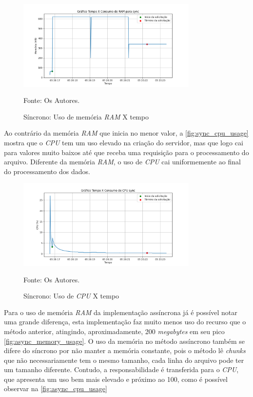 \documentclass[12pt]{article}
\begin{document}
\begin{figure}[!h]
\centering
\caption{Síncrono: Uso de memória \textit{RAM} X tempo}
\includegraphics[width=0.8\textwidth]{images/pt-br/results/sync_memory_usage.png}
\label{fig:sync_memory_usage}

Fonte: Os Autores.
\end{figure}


Ao contrário da memória \textit{RAM} que inicia no menor valor, a \autoref{fig:sync_cpu_usage}
mostra que o \textit{CPU} tem um uso elevado na criação do servidor, mas que logo
cai para valores muito baixos até que receba uma requisição para o processamento do arquivo. 
Diferente da memória \textit{RAM}, o uso de \textit{CPU} cai uniformemente ao final 
do processamento dos dados.


\begin{figure}[!h]
\centering
\caption{Síncrono: Uso de \textit{CPU} X tempo}
\includegraphics[width=0.8\textwidth]{images/pt-br/results/sync_cpu_usage.png}
\label{fig:sync_cpu_usage}

Fonte: Os Autores.
\end{figure}


Para o uso de memória \textit{RAM} da implementação assíncrona já é possível
notar uma grande diferença, esta implementação faz muito menos uso do recurso que
o método anterior, atingindo, aproximadamente, 200 \textit{megabytes} em seu pico
\autoref{fig:async_memory_usage}. O uso da memória no método assíncrono também se
difere do síncrono por não manter a memória constante, pois o método lê \textit{chunks}
que não necessariamente tem o mesmo tamanho, cada linha do arquivo pode ter um
tamanho diferente. Contudo, a responsabilidade é transferida para o \textit{CPU},
que apresenta um uso bem mais elevado e próximo ao 100\text{\%}, como é possível
observar na \autoref{fig:async_cpu_usage}
\end{document}
